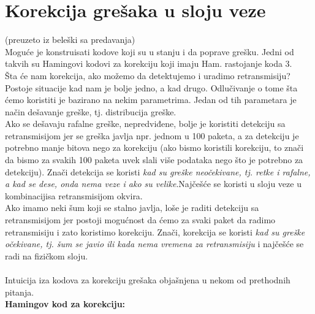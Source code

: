 \documentclass{article} %
\begin{document}
\section{Korekcija grešaka u sloju veze}
(preuzeto iz beleški sa predavanja)\\

Moguće je konstruisati kodove koji su  u stanju i da poprave grešku. Jedni od takvih su Hamingovi kodovi za korekciju koji imaju Ham. rastojanje koda 3. \\
Šta će nam korekcija, ako možemo da detektujemo i uradimo retransmisiju? Postoje situacije kad nam je bolje jedno, a kad drugo. Odlučivanje o tome šta ćemo koristiti je bazirano na nekim parametrima. Jedan od tih parametara je način dešavanje greške, tj. distribucija greške.\\
 Ako se dešavaju rafalne greške, nepredviđene, bolje je koristiti detekciju sa retransmisijom jer se greška javlja npr. jednom u 100 paketa, a za detekciju je potrebno manje bitova nego za korekciju (ako bismo koristili korekciju, to znači da bismo za svakih 100 paketa uvek slali više podataka nego što je potrebno za detekciju). Znači detekcija se koristi \textit{kad su greške neočekivane, tj. retke i rafalne, a kad se dese, onda nema veze i ako su velike}.Najčešće se koristi u sloju veze u kombinacijisa retransmisijom okvira.\\
 Ako imamo neki šum koji se stalno javlja, loše je raditi detekciju sa retransmisijom jer postoji mogućnost da ćemo za svaki paket da radimo retransmisiju i zato koristimo korekciju. Znači, korekcija se koristi \textit{kad su greške očekivane, tj. šum se javio ili kada nema vremena za retransmisiju} i najčešće se radi na fizičkom sloju.\\\\

Intuicija iza kodova za korekciju grešaka objašnjena u nekom od prethodnih pitanja.\\

\textbf{Hamingov kod za korekciju:}\\
\end{document}
